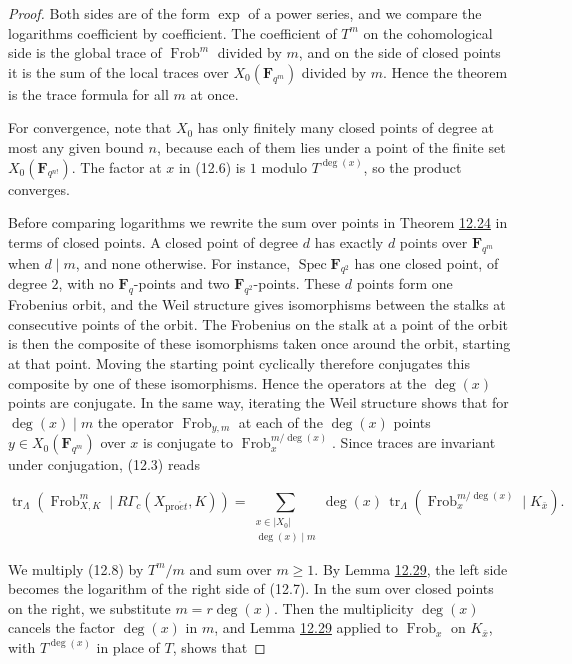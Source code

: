 \documentclass[11pt]{article}
\begin{document}
\begin{proof}[{Proof}]\label{bp318}%
Both sides are of the form \(\exp\) of a power series, and we compare the logarithms coefficient by coefficient. The coefficient of \(T^m\) on the cohomological side is the global trace of \(\operatorname{Frob}^m\) divided by \(m\), and on the side of closed points it is the sum of the local traces over \(X_0(\mathbf F_{q^m})\) divided by \(m\). Hence the theorem is the trace formula for all \(m\) at once.

For convergence, note that \(X_0\) has only finitely many closed points of degree at most any given bound \(n\), because each of them lies under a point of the finite set \(X_0(\mathbf F_{q^{n!}})\). The factor at \(x\) in (12.6) is \(1\) modulo \(T^{\deg(x)}\), so the product converges.

Before comparing logarithms we rewrite the sum over points in Theorem \hyperref[bp298]{12.24} in terms of closed points. A closed point of degree \(d\) has exactly \(d\) points over \(\mathbf F_{q^m}\) when \(d\mid m\), and none otherwise. For instance, \(\operatorname{Spec}\mathbf F_{q^2}\) has one closed point, of degree \(2\), with no \(\mathbf F_q\)-points and two \(\mathbf F_{q^2}\)-points. These \(d\) points form one Frobenius orbit, and the Weil structure gives isomorphisms between the stalks at consecutive points of the orbit. The Frobenius on the stalk at a point of the orbit is then the composite of these isomorphisms taken once around the orbit, starting at that point. Moving the starting point cyclically therefore conjugates this composite by one of these isomorphisms. Hence the operators at the \(\deg(x)\) points are conjugate. In the same way, iterating the Weil structure shows that for \(\deg(x)\mid m\) the operator \(\operatorname{Frob}_{y,m}\) at each of the \(\deg(x)\) points \(y\in X_0(\mathbf F_{q^m})\) over \(x\) is conjugate to \(\operatorname{Frob}_x^{m/\deg(x)}\). Since traces are invariant under conjugation, (12.3) reads

\[
\operatorname{tr}_{\Lambda}(\operatorname{Frob}_{X,K}^m\mid R\Gamma_c(X_{\mathrm{pro}\acute{e}t},K))
=\sum_{\substack{x\in|X_0|\\\deg(x)\mid m}}\deg(x)\,
\operatorname{tr}_{\Lambda}
(\operatorname{Frob}_x^{m/\deg(x)}\mid K_{\bar x}).
\tag{12.8}
\]

We multiply (12.8) by \(T^m/m\) and sum over \(m\geq1\). By Lemma \hyperref[bp314]{12.29}, the left side becomes the logarithm of the right side of (12.7). In the sum over closed points on the right, we substitute \(m=r\deg(x)\). Then the multiplicity \(\deg(x)\) cancels the factor \(\deg(x)\) in \(m\), and Lemma \hyperref[bp314]{12.29} applied to \(\operatorname{Frob}_x\) on \(K_{\bar x}\), with \(T^{\deg(x)}\) in place of \(T\), shows that


\end{proof}
\end{document}
